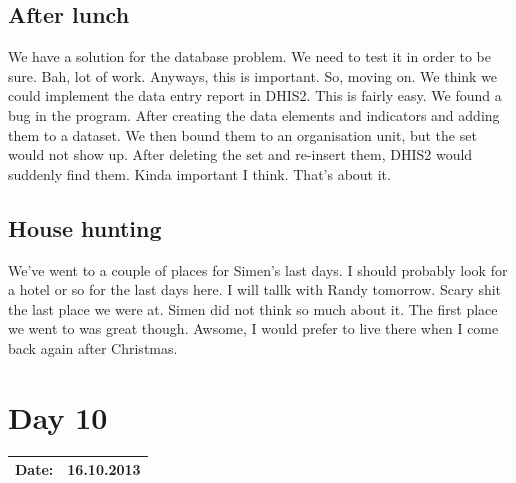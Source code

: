 \subsection{After lunch}
We have a solution for the database problem. We need to test it in order to be sure. Bah, lot of work. Anyways, this is important. So, moving on. We think we could implement the data entry report in DHIS2. This is fairly easy. We found a bug in the program. After creating the data elements and indicators and adding them to a dataset. We then bound them to an organisation unit, but the set would not show up. After deleting the set and re-insert them, DHIS2 would suddenly find them. Kinda important I think. That's about it.
\subsection{House hunting}
We've went to a couple of places for Simen's last days. I should probably look for a hotel or so for the last days here. I will tallk with Randy tomorrow. Scary shit the last place we were at. Simen did not think so much about it. The first place we went to was great though. Awsome, I would prefer to live there when I come back again after Christmas.
\section{Day 10}
\begin{tabular}{|c|c|}
\hline
Date: & 16.10.2013 \\
\hline
\end{tabular}
